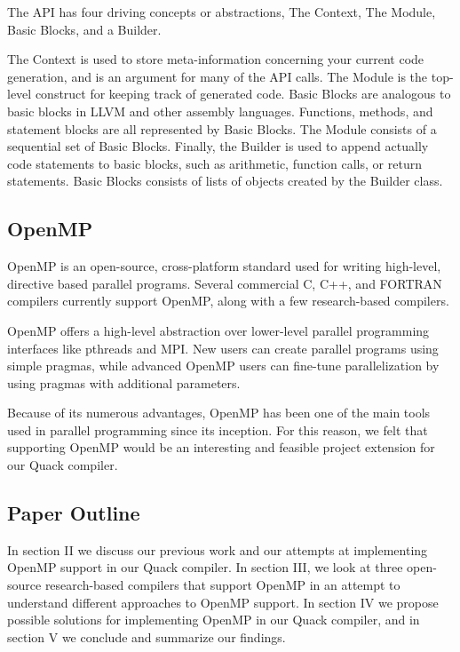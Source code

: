 \documentclass[11pt,journal]{IEEEtran}
\begin{document}
    The API has four driving concepts or abstractions, The Context, The Module,
    Basic Blocks, and a Builder.

    The Context is used to store meta-information concerning your current code generation,
    and is an argument for many of the API calls. The Module is the top-level construct
    for keeping track of generated code. Basic Blocks are analogous to basic blocks
    in LLVM and other assembly languages. Functions, methods, and statement blocks are
    all represented by Basic Blocks. The Module consists of a sequential set of Basic
    Blocks. Finally, the Builder is used to append actually code statements to basic
    blocks, such as arithmetic, function calls, or return statements. Basic
    Blocks consists of lists of objects created by the Builder class.

\subsection{OpenMP}

    OpenMP \cite{openmp}  is an open-source, cross-platform  standard used
    for writing high-level, directive based parallel programs.
    Several commercial C, C++, and FORTRAN compilers currently support OpenMP,
    along with a few research-based compilers.

    OpenMP offers a high-level abstraction over lower-level parallel programming
    interfaces like pthreads and MPI. New users can create parallel programs using
    simple pragmas, while advanced OpenMP users can fine-tune parallelization by
    using pragmas with additional parameters.

    Because of its numerous advantages, OpenMP has been one of the main tools used in
    parallel programming since its inception.
    For this reason, we felt that supporting OpenMP would be an interesting and
    feasible project extension for our Quack compiler.
    
\subsection{Paper Outline}
    In section II we discuss our previous work and our attempts at implementing
    OpenMP support in our Quack compiler. In section III, we look at three open-source
    research-based compilers that support OpenMP in an attempt to understand
    different approaches to OpenMP support. In section IV we propose possible
    solutions for implementing OpenMP in our Quack compiler, and in section
    V we conclude and summarize our findings.
\end{document}

